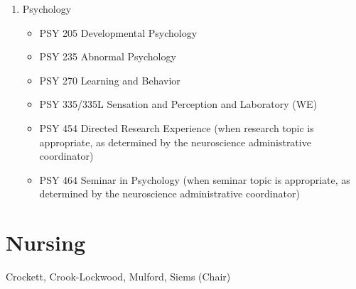 \documentclass[
  letterpaper,
]{scrbook}
\providecommand{\tightlist}{%
  \setlength{\itemsep}{0pt}\setlength{\parskip}{0pt}}
\begin{document}
\begin{enumerate}
\begin{enumerate}
    \begin{itemize}
    \tightlist
    \item
      CHM 211/211L Analytical Chemistry and Laboratory (WE)\\
    \item
      CHM 221 Organic Chemistry I\\
    \item
      CHM 321 Organic Chemistry II\\
    \item
      CHM 421 Advanced Organic Chemistry\\
    \item
      CHM 431/431L Biochemistry and Laboratory\\
    \item
      CHM 432 Protein Biochemistry\\
    \end{itemize}
  \item
    Psychology

    \begin{itemize}
    \tightlist
    \item
      PSY 205 Developmental Psychology\\
    \item
      PSY 235 Abnormal Psychology\\
    \item
      PSY 270 Learning and Behavior\\
    \item
      PSY 335/335L Sensation and Perception and Laboratory (WE)\\
    \item
      PSY 454 Directed Research Experience (when research topic is
      appropriate, as determined by the neuroscience administrative
      coordinator)\\
    \item
      PSY 464 Seminar in Psychology (when seminar topic is appropriate,
      as determined by the neuroscience administrative coordinator)
    \end{itemize}
  \end{enumerate}
\end{enumerate}

\section{Nursing}\label{nursing}

Crockett, Crook-Lockwood, Mulford, Siems (Chair)
\end{document}
